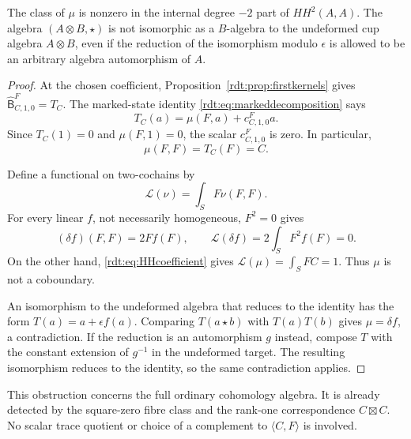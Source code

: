 \begin{proposition}
\label{rdt:prop:HHnonzero}
The class of $\mu$ is nonzero in the internal degree $-2$ part of
$HH^2(A,A)$. The algebra $(A\otimes B,\star)$ is not isomorphic
as a $B$-algebra to the undeformed cup algebra $A\otimes B$,
even if the reduction of the isomorphism modulo $\epsilon$ is
allowed to be an arbitrary algebra automorphism of $A$.
\end{proposition}
\begin{proof}
At the chosen coefficient, Proposition~\ref{rdt:prop:firstkernels}
gives $\widehat{\mathsf B}^{F}_{C,1,0}=T_C$. The marked-state
identity \eqref{rdt:eq:markeddecomposition} says
\[
 T_C(a)=\mu(F,a)+c^F_{C,1,0}a.
\]
Since $T_C(1)=0$ and $\mu(F,1)=0$, the scalar $c^F_{C,1,0}$ is
zero. In particular,
\begin{equation}\label{rdt:eq:HHcoefficient}
 \mu(F,F)=T_C(F)=C.
\end{equation}

Define a functional on two-cochains by
\[
 \mathcal L(\nu)=\int_S F\nu(F,F).
\]
For every linear $f$, not necessarily homogeneous, $F^2=0$ gives
\[
 (\delta f)(F,F)=2Ff(F),\qquad
 \mathcal L(\delta f)=2\int_SF^2f(F)=0.
\]
On the other hand, \eqref{rdt:eq:HHcoefficient} gives
$\mathcal L(\mu)=\int_SFC=1$. Thus $\mu$ is not a coboundary.

An isomorphism to the undeformed algebra that reduces to the
identity has the form $T(a)=a+\epsilon f(a)$. Comparing
$T(a\star b)$ with $T(a)T(b)$ gives $\mu=\delta f$, a
contradiction. If the reduction is an automorphism $g$ instead,
compose $T$ with the constant extension of $g^{-1}$ in the
undeformed target. The resulting isomorphism reduces to the
identity, so the same contradiction applies.
\end{proof}

This obstruction concerns the full ordinary cohomology algebra.
It is already detected by the square-zero fibre class and the
rank-one correspondence $C\boxtimes C$. No scalar trace quotient
or choice of a complement to $\langle C,F\rangle$ is involved.

